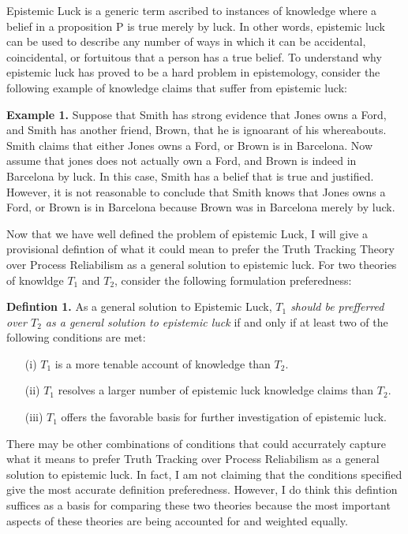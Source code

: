 \documentclass{article}
\begin{document}
Epistemic Luck is a generic term ascribed to instances of knowledge where a
belief in a proposition P is true merely by luck. In other words, epistemic luck
can be used to describe any number of ways in which it can be accidental,
coincidental, or fortuitous that a person has a true belief. To understand why
epistemic luck has proved to be a hard problem in epistemology, consider the
following example of knowledge claims that suffer from epistemic luck:

\begin{displayquote}
\textbf{Example 1.} Suppose that Smith has strong evidence that Jones owns
a Ford, and Smith has another friend, Brown, that he is ignoarant of his whereabouts.
Smith claims that either Jones owns a Ford, or Brown is in Barcelona. Now assume that
jones does not actually own a Ford, and Brown is indeed in Barcelona by luck.
In this case, Smith has a belief that is true and justified. However, it is not
reasonable to conclude that Smith knows that Jones owns a Ford, or Brown is in Barcelona
because Brown was in Barcelona merely by luck.
\end{displayquote}


Now that we have well defined the problem of epistemic Luck, I will give a
provisional defintion of what it could mean to prefer the Truth Tracking Theory
over Process Reliabilism as a general solution to epistemic luck. For two theories
of knowldge $T_{1}$ and $T_{2}$, consider the following formulation preferedness:
\begin{displayquote}
    \textbf{Defintion 1.} As a general solution to Epistemic Luck,
    \textit{$T_{1}$ should be prefferred over $T_{2}$ as a general solution
    to epistemic luck} if and only if at least two of the following conditions are met:
    \begin{enumerate}
        \item[(i)] $T_{1}$ is a more tenable account of knowledge than $T_{2}$.
        \item[(ii)] $T_{1}$ resolves a larger number of epistemic luck knowledge claims than $T_{2}$.
        \item[(iii)] $T_{1}$ offers the favorable basis for further investigation of epistemic luck.
    \end{enumerate}
\end{displayquote}
  There may be other combinations of conditions that could accurrately capture
what it means to prefer Truth Tracking over Process Reliabilism as a general
solution to epistemic luck. In fact, I am not claiming that the conditions
specified give the most accurate definition preferedness. However, I do think
this defintion suffices as a basis for comparing these two theories because
the most important aspects of these theories are being accounted for and weighted
equally.
\end{document}
